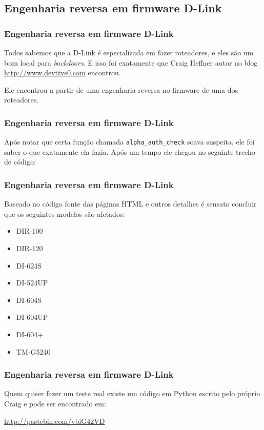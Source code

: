 \subsection{Engenharia reversa em firmware D-Link}

\begin{frame}[fragile]\frametitle{Engenharia reversa em firmware D-Link}

Todos sabemos que a D-Link é especializada em fazer roteadores, e eles
são um bom local para \emph{backdoors}. E isso foi exatamente que Craig
Heffner autor no blog \url{http://www.devttys0.com} encontrou.

Ele encontrou a partir de uma engenharia reversa no firmware de uma dos
roteadores.

\end{frame}

\begin{frame}[fragile]\frametitle{Engenharia reversa em firmware D-Link}

Após notar que certa função chamada \texttt{alpha\_auth\_check} soava
suspeita, ele foi saber o que exatamente ela fazia. Após um tempo ele
chegou no seguinte trecho de código:


\end{frame}

\begin{frame}\frametitle{Engenharia reversa em firmware D-Link}

Baseado no código fonte das páginas HTML e outros detalhes é sensato
concluir que os seguintes modelos são afetados:

\begin{itemize}
\item
  DIR-100
\item
  DIR-120
\item
  DI-624S
\item
  DI-524UP
\item
  DI-604S
\item
  DI-604UP
\item
  DI-604+
\item
  TM-G5240
\end{itemize}
\end{frame}

\begin{frame}[fragile]\frametitle{Engenharia reversa em firmware D-Link}

Quem quiser fazer um teste real existe um código em Python escrito pelo
próprio Craig e pode ser encontrado em:

\url{http://pastebin.com/vbiG42VD}


\end{frame}

